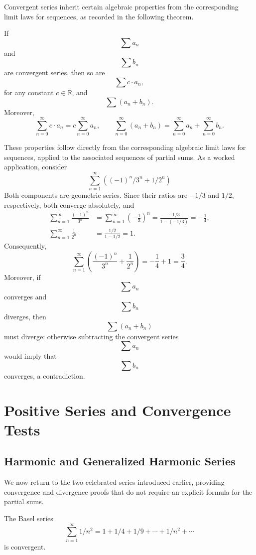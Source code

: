 Convergent series inherit certain algebraic properties from the corresponding limit laws for sequences, as recorded in the following theorem.

\begin{theorem}
If \[
\sum a_n
\] and \[
\sum b_n
\] are convergent series, then so are \[
\sum c \cdot a_n,
\] for any constant $c \in \mathbb{R}$, and \[
\sum (a_n + b_n).
\] Moreover,
\[
\sum_{n=0}^{\infty} c \cdot a_n = c \sum_{n=0}^{\infty} a_n, \qquad \sum_{n=0}^{\infty} (a_n + b_n) = \sum_{n=0}^{\infty} a_n + \sum_{n=0}^{\infty} b_n.
\]

\end{theorem}

These properties follow directly from the corresponding algebraic limit laws for sequences, applied to the associated sequences of partial sums. As a worked application, consider
\[
\sum_{n=1}^{\infty} ( (-1)^n / 3^n + 1/2^n )
\]
Both components are geometric series. Since their ratios are $-1/3$ and
$1/2$, respectively, both converge absolutely, and
\[
\begin{aligned}
\sum_{n=1}^{\infty}\frac{(-1)^n}{3^n}
&=\sum_{n=1}^{\infty}\left(-\frac13\right)^n
=\frac{-1/3}{1-(-1/3)}=-\frac14,\\
\sum_{n=1}^{\infty}\frac1{2^n}
&=\frac{1/2}{1-1/2}=1.
\end{aligned}
\]
Consequently,
\[
\sum_{n=1}^{\infty}\left(\frac{(-1)^n}{3^n}+\frac1{2^n}\right)
=-\frac14+1=\frac34.
\]
Moreover, if \[
\sum a_n
\] converges and \[
\sum b_n
\] diverges, then
\[
\sum(a_n+b_n)
\] must diverge: otherwise subtracting the convergent series
\[
\sum a_n
\] would imply that \[
\sum b_n
\] converges, a contradiction.

\section{Positive Series and Convergence Tests}

\subsection{Harmonic and Generalized Harmonic Series}

We now return to the two celebrated series introduced earlier, providing convergence and divergence proofs that do not require an explicit formula for the partial sums.

\begin{theorem}
The Basel series
\[
\sum_{n=1}^{\infty} 1/n^2 = 1 + 1/4 + 1/9 + \cdots + 1/n^2 + \cdots
\]
is convergent.
\end{theorem}

